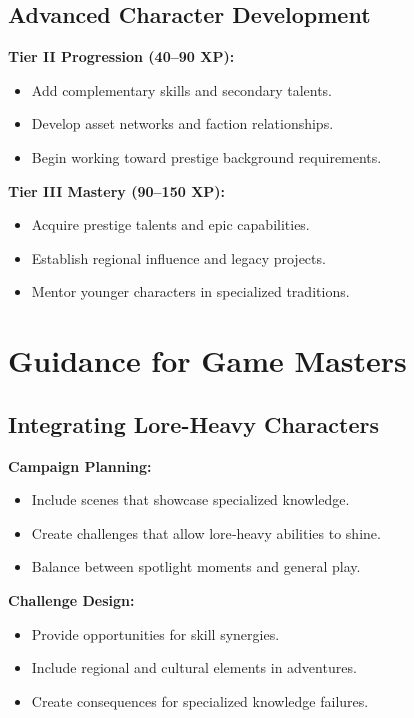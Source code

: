 \subsection{Advanced Character Development}\label{subsec:advanced_development}

\textbf{Tier II Progression (40--90 XP):}
\begin{itemize}
    \item Add complementary skills and secondary talents.
    \item Develop asset networks and faction relationships.
    \item Begin working toward prestige background requirements.
\end{itemize}

\textbf{Tier III Mastery (90--150 XP):}
\begin{itemize}
    \item Acquire prestige talents and epic capabilities.
    \item Establish regional influence and legacy projects.
    \item Mentor younger characters in specialized traditions.
\end{itemize}

\section{Guidance for Game Masters}\label{sec:gm_guidance}

\subsection{Integrating Lore-Heavy Characters}\label{subsec:integration_guidance}

\textbf{Campaign Planning:}
\begin{itemize}
    \item Include scenes that showcase specialized knowledge.
    \item Create challenges that allow lore‑heavy abilities to shine.
    \item Balance between spotlight moments and general play.
\end{itemize}

\textbf{Challenge Design:}
\begin{itemize}
    \item Provide opportunities for skill synergies.
    \item Include regional and cultural elements in adventures.
    \item Create consequences for specialized knowledge failures.
\end{itemize}

